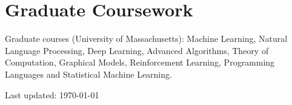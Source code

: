\documentclass[10pt, a4paper]{article}
\begin{document}
\section*{Graduate Coursework}

Graduate courses (University of Massachusetts): Machine Learning, Natural Language Processing, Deep Learning, Advanced Algorithms, Theory of Computation, Graphical Models, Reinforcement Learning, Programming Languages and Statistical Machine Learning.

\begin{center}
{\scriptsize  Last updated: \today\-
\\}
\end{center}
\end{document}
